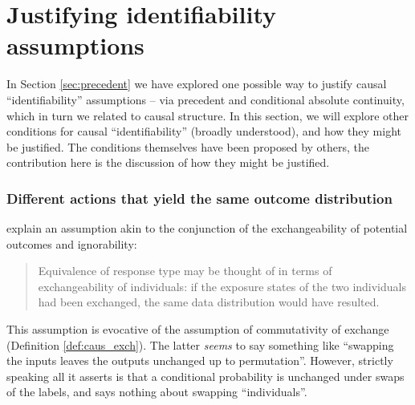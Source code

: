 \section{Justifying identifiability assumptions}\label{sec:justifying}

In Section \ref{sec:precedent} we have explored one possible way to justify causal ``identifiability'' assumptions -- via precedent and conditional absolute continuity, which in turn we related to causal structure. In this section, we will explore other conditions for causal ``identifiability'' (broadly understood), and how they might be justified. The conditions themselves have been proposed by others, the contribution here is the discussion of how they might be justified.

\subsubsection{Different actions that yield the same outcome distribution}\label{sec:exch_peop}

\citet{greenland_identifiability_1986} explain an assumption akin to the conjunction of the exchangeability of potential outcomes and ignorability:
\begin{quote}
    Equivalence of response type may be thought of in terms of exchangeability of individuals: if the exposure states of the two individuals had been exchanged, the same data distribution would have resulted.
\end{quote}
This assumption is evocative of the assumption of commutativity of exchange (Definition \ref{def:caus_exch}). The latter \emph{seems} to say something like ``swapping the inputs leaves the outputs unchanged up to permutation''. However, strictly speaking all it asserts is that a conditional probability is unchanged under swaps of the labels, and says nothing about swapping ``individuals''.

